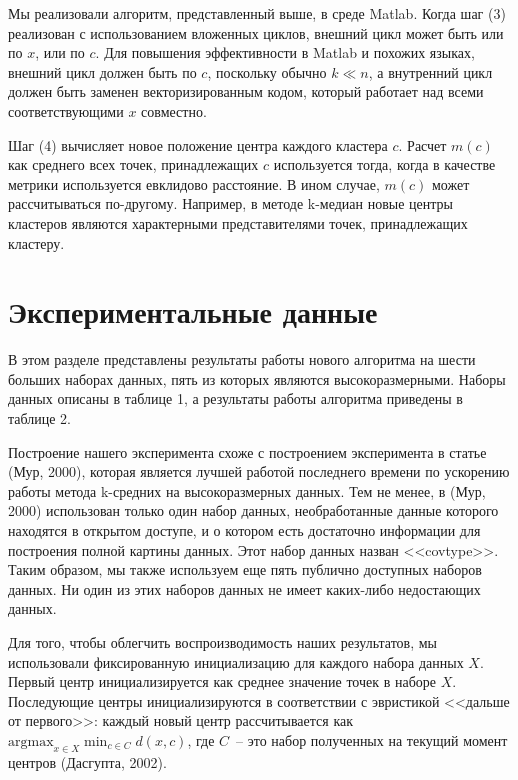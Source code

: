 Мы реализовали алгоритм, представленный выше, в среде Matlab. Когда шаг (3) реализован с использованием вложенных циклов, внешний цикл может быть или по \( x \), или по \( c \). Для повышения эффективности в Matlab и похожих языках, внешний цикл должен быть по \( c \), поскольку обычно \( k \ll n \), а внутренний цикл должен быть заменен векторизированным кодом, который работает над всеми соответствующими \( x \) совместно.

Шаг (4) вычисляет новое положение центра каждого кластера \( c \). Расчет \( m(c) \) как среднего всех точек, принадлежащих \( c \) используется тогда, когда в качестве метрики используется евклидово расстояние. В ином случае, \( m(c) \) может рассчитываться по-другому. Например, в методе k-медиан новые центры кластеров являются характерными представителями точек, принадлежащих кластеру.

\chapter{Экспериментальные данные}

В этом разделе представлены результаты работы нового алгоритма на шести больших наборах данных, пять из которых являются высокоразмерными. Наборы данных описаны в таблице 1, а результаты работы алгоритма приведены в таблице 2.

Построение нашего эксперимента схоже с построением эксперимента в статье (Мур, 2000), которая является лучшей работой последнего времени по ускорению работы метода k-средних на высокоразмерных данных. Тем не менее, в (Мур, 2000) использован только один набор данных, необработанные данные которого находятся в открытом доступе, и о котором есть достаточно информации для построения полной картины данных. Этот набор данных назван <<covtype>>. Таким образом, мы также используем еще пять публично доступных наборов данных. Ни один из этих наборов данных не имеет каких-либо недостающих данных.

Для того, чтобы облегчить воспроизводимость наших результатов, мы использовали фиксированную инициализацию для каждого набора данных \( X \). Первый центр инициализируется как среднее значение точек в наборе \( X \). Последующие центры инициализируются в соответствии с эвристикой <<дальше от первого>>: каждый новый центр рассчитывается как \( \mathrm{argmax}_{x \in X} \min_{c \in C} d(x, c) \), где \( C \)~-- это набор полученных на текущий момент центров (Дасгупта, 2002).


